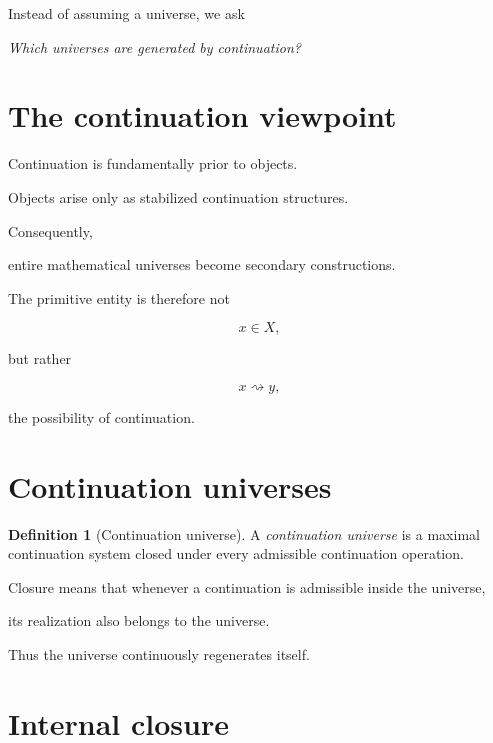 \documentclass[13pt,openany]{book}
\theoremstyle{plain}
\theoremstyle{definition}
\newtheorem{definition}{Definition}[chapter]
\begin{document}
Instead of assuming a universe, we ask

\begin{center}
\emph{Which universes are generated by continuation?}
\end{center}


\section{The continuation viewpoint}

Continuation is fundamentally prior to objects.

Objects arise only as stabilized continuation structures.

Consequently,

entire mathematical universes become secondary constructions.

The primitive entity is therefore not

\[
x\in X,
\]

but rather

\[
x
\rightsquigarrow
y,
\]

the possibility of continuation.


\section{Continuation universes}

\begin{definition}[Continuation universe]

A
\emph{continuation universe}
is a maximal continuation system closed under every admissible continuation operation.

\end{definition}

Closure means that whenever a continuation is admissible inside the universe,

its realization also belongs to the universe.

Thus the universe continuously regenerates itself.


\section{Internal closure}
\end{document}
